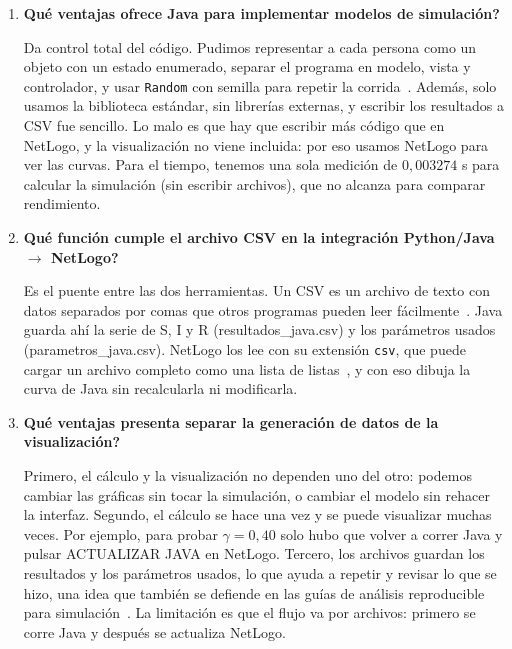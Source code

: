 \documentclass[11pt,a4paper]{article}
\begin{document}
\begin{enumerate}
  \item \textbf{\textquestiondown{}Qué ventajas ofrece Java para implementar modelos de simulación?}
  \par Da control total del código. Pudimos representar a cada persona como un objeto con un estado enumerado, separar el programa en modelo, vista y controlador, y usar \texttt{Random} con semilla para repetir la corrida~\cite{java}. Además, solo usamos la biblioteca estándar, sin librerías externas, y escribir los resultados a CSV fue sencillo. Lo malo es que hay que escribir más código que en NetLogo, y la visualización no viene incluida: por eso usamos NetLogo para ver las curvas. Para el tiempo, tenemos una sola medición de $0{,}003274$ s para calcular la simulación (sin escribir archivos), que no alcanza para comparar rendimiento.
  \item \textbf{\textquestiondown{}Qué función cumple el archivo CSV en la integración Python/Java $\rightarrow$ NetLogo?}
  \par Es el puente entre las dos herramientas. Un CSV es un archivo de texto con datos separados por comas que otros programas pueden leer fácilmente~\cite{csv}. Java guarda ahí la serie de S, I y R (resultados\_java.csv) y los parámetros usados (parametros\_java.csv). NetLogo los lee con su extensión \texttt{csv}, que puede cargar un archivo completo como una lista de listas~\cite{csv}, y con eso dibuja la curva de Java sin recalcularla ni modificarla.
  \item \textbf{\textquestiondown{}Qué ventajas presenta separar la generación de datos de la visualización?}
  \par Primero, el cálculo y la visualización no dependen uno del otro: podemos cambiar las gráficas sin tocar la simulación, o cambiar el modelo sin rehacer la interfaz. Segundo, el cálculo se hace una vez y se puede visualizar muchas veces. Por ejemplo, para probar $\gamma=0{,}40$ solo hubo que volver a correr Java y pulsar ACTUALIZAR JAVA en NetLogo. Tercero, los archivos guardan los resultados y los parámetros usados, lo que ayuda a repetir y revisar lo que se hizo, una idea que también se defiende en las guías de análisis reproducible para simulación~\cite{heather2026}. La limitación es que el flujo va por archivos: primero se corre Java y después se actualiza NetLogo.
\end{enumerate}

\FloatBarrier
\end{document}
